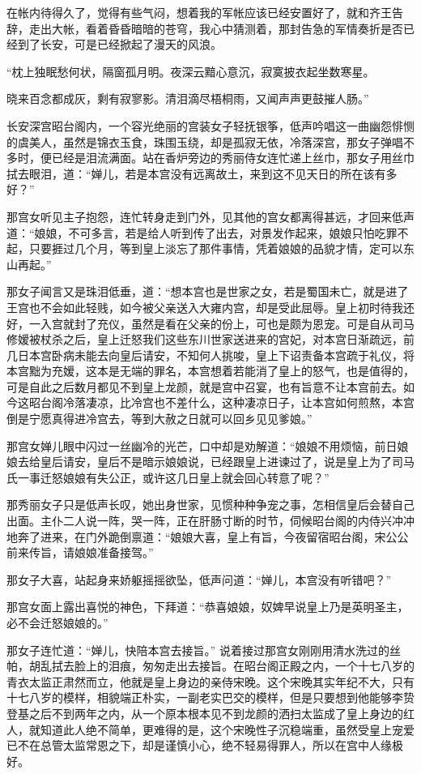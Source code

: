 在帐内待得久了，觉得有些气闷，想着我的军帐应该已经安置好了，就和齐王告辞，走出大帐，看着昏昏暗暗的苍穹，我心中猜测着，那封告急的军情奏折是否已经到了长安，可是已经掀起了漫天的风浪。

“枕上独眠愁何状，隔窗孤月明。夜深云黯心意沉，寂寞披衣起坐数寒星。

晓来百念都成灰，剩有寂寥影。清泪滴尽梧桐雨，又闻声声更鼓摧人肠。”

长安深宫昭台阁内，一个容光绝丽的宫装女子轻抚银筝，低声吟唱这一曲幽怨悱恻的虞美人，虽然是锦衣玉食，珠围玉绕，却是孤寂无依，冷落深宫，那女子弹唱不多时，便已经是泪流满面。站在香炉旁边的秀丽侍女连忙递上丝巾，那女子用丝巾拭去眼泪，道：“婵儿，若是本宫没有远离故土，来到这不见天日的所在该有多好？”

那宫女听见主子抱怨，连忙转身走到门外，见其他的宫女都离得甚远，才回来低声道：“娘娘，不可多言，若是给人听到传了出去，对景发作起来，娘娘只怕吃罪不起，只要捱过几个月，等到皇上淡忘了那件事情，凭着娘娘的品貌才情，定可以东山再起。”

那女子闻言又是珠泪低垂，道：“想本宫也是世家之女，若是蜀国未亡，就是进了王宫也不会如此轻贱，如今被父亲送入大雍内宫，却是受此屈辱。皇上初时待我还好，一入宫就封了充仪，虽然是看在父亲的份上，可也是颇为恩宠。可是自从司马修嫒被杖杀之后，皇上迁怒我们这些东川世家送进来的宫妃，对本宫日渐疏远，前几日本宫卧病未能去向皇后请安，不知何人挑唆，皇上下诏责备本宫疏于礼仪，将本宫黜为充嫒，这本是无端的罪名，本宫想着若能消了皇上的怒气，也是值得的，可是自此之后数月都见不到皇上龙颜，就是宫中召宴，也有旨意不让本宫前去。如今这昭台阁冷落凄凉，比冷宫也不差什么，这种凄凉日子，让本宫如何煎熬，本宫倒是宁愿真得进冷宫去，等到大赦之日就可以回乡见见爹娘。”

那宫女婵儿眼中闪过一丝幽冷的光芒，口中却是劝解道：“娘娘不用烦恼，前日娘娘去给皇后请安，皇后不是暗示娘娘说，已经跟皇上进谏过了，说是皇上为了司马氏一事迁怒娘娘有失公正，或许这几日皇上就会回心转意了呢？”

那秀丽女子只是低声长叹，她出身世家，见惯种种争宠之事，怎相信皇后会替自己出面。主仆二人说一阵，哭一阵，正在肝肠寸断的时节，伺候昭台阁的内侍兴冲冲地奔了进来，在门外跪倒禀道：“娘娘大喜，皇上有旨，今夜留宿昭台阁，宋公公前来传旨，请娘娘准备接驾。”

那女子大喜，站起身来娇躯摇摇欲坠，低声问道：“婵儿，本宫没有听错吧？”

那宫女面上露出喜悦的神色，下拜道：“恭喜娘娘，奴婢早说皇上乃是英明圣主，必不会迁怒娘娘的。”

那女子连忙道：“婵儿，快陪本宫去接旨。” 说着接过那宫女刚刚用清水洗过的丝帕，胡乱拭去脸上的泪痕，匆匆走出去接旨。在昭台阁正殿之内，一个十七八岁的青衣太监正肃然而立，他就是皇上身边的亲侍宋晚。这个宋晚其实年纪不大，只有十七八岁的模样，相貌端正朴实，一副老实巴交的模样，但是只要想到他能够李贽登基之后不到两年之内，从一个原本根本见不到龙颜的洒扫太监成了皇上身边的红人，就知道此人绝不简单，更难得的是，这个宋晚性子沉稳端重，虽然受皇上宠爱已不在总管太监常恩之下，却是谨慎小心，绝不轻易得罪人，所以在宫中人缘极好。

